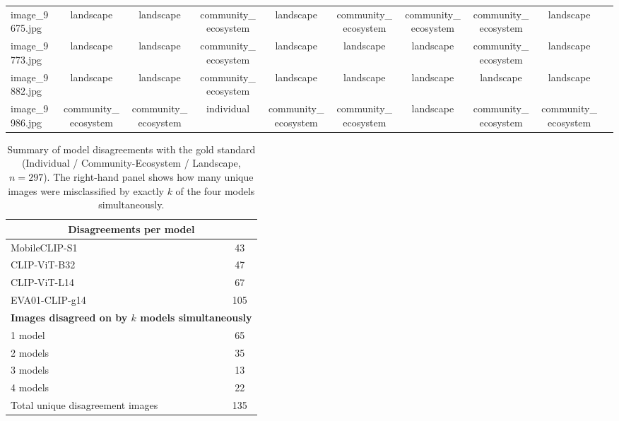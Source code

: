 \documentclass[hidelinks, 11pt]{article}
\begin{document}
\begin{longtable}{@{}lccccccccc@{}}
image\_9675.jpg  & landscape & landscape & community\_ecosystem & landscape & community\_ecosystem & community\_ecosystem & community\_ecosystem & landscape \\
image\_9773.jpg  & landscape & landscape & community\_ecosystem & landscape & landscape & landscape & community\_ecosystem & landscape \\
image\_9882.jpg  & landscape & landscape & community\_ecosystem & landscape & landscape & landscape & landscape & landscape \\
image\_9986.jpg  & community\_ecosystem & community\_ecosystem & individual & community\_ecosystem & community\_ecosystem & landscape & community\_ecosystem & community\_ecosystem \\

\end{longtable}

\begin{table}[htbp]
\centering
\caption{Summary of model disagreements with the gold standard (Individual / Community-Ecosystem / Landscape, $n=297$). The right-hand panel shows how many unique images were misclassified by exactly $k$ of the four models simultaneously.}
\label{tab:disagreement_summary_indcoecoland}
\begin{tabular}{@{}lc@{}}
\toprule
\multicolumn{2}{c}{\textbf{Disagreements per model}} \\
\midrule
MobileCLIP-S1  & 43 \\
CLIP-ViT-B32   & 47 \\
CLIP-ViT-L14   & 67 \\
EVA01-CLIP-g14 & 105 \\
\midrule
\multicolumn{2}{c}{\textbf{Images disagreed on by $k$ models simultaneously}} \\
\midrule
1 model  & 65 \\
2 models & 35 \\
3 models & 13 \\
4 models & 22 \\
\midrule
Total unique disagreement images & 135 \\
\bottomrule
\end{tabular}
\end{table}
\end{document}
